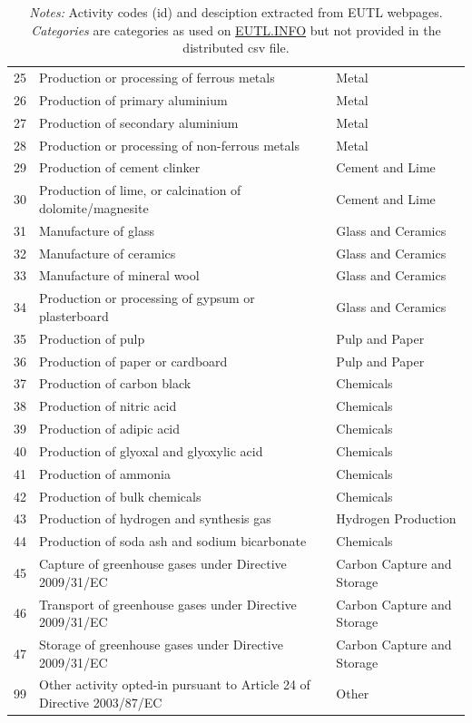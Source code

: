 \documentclass[authoryear]{elsarticle}
\begin{document}
\begin{table}[htbp]
\begin{tabular*}{\textwidth}{@{}@{\extracolsep{\fill}} lp{30.18em}l @{}}
		25    & Production or processing of ferrous metals & Metal \\
		26    & Production of primary aluminium & Metal \\
		27    & Production of secondary aluminium & Metal \\
		28    & Production or processing of non-ferrous metals & Metal \\
		29    & Production of cement clinker & Cement and Lime \\
		30    & Production of lime, or calcination of dolomite/magnesite & Cement and Lime \\
		31    & Manufacture of glass & Glass and Ceramics \\
		32    & Manufacture of ceramics & Glass and Ceramics \\
		33    & Manufacture of mineral wool & Glass and Ceramics \\
		34    & Production or processing of gypsum or plasterboard & Glass and Ceramics \\
		35    & Production of pulp & Pulp and Paper \\
		36    & Production of paper or cardboard & Pulp and Paper \\
		37    & Production of carbon black & Chemicals \\
		38    & Production of nitric acid & Chemicals \\
		39    & Production of adipic acid & Chemicals \\
		40    & Production of glyoxal and glyoxylic acid & Chemicals \\
		41    & Production of ammonia & Chemicals \\
		42    & Production of bulk chemicals & Chemicals \\
		43    & Production of hydrogen and synthesis gas & Hydrogen Production \\
		44    & Production of soda ash and sodium bicarbonate & Chemicals \\
		45    & Capture of greenhouse gases under Directive 2009/31/EC & Carbon Capture and Storage \\
		46    & Transport of greenhouse gases under Directive 2009/31/EC & Carbon Capture and Storage \\
		47    & Storage of greenhouse gases under Directive 2009/31/EC & Carbon Capture and Storage \\
		99	  & Other activity opted-in pursuant to Article 24 of Directive 2003/87/EC&	Other\\
		\bottomrule
		\bottomrule
	\end{tabular*}%
	\vspace{0ex}
	\caption*{\footnotesize \emph{Notes:} Activity codes (id) and desciption extracted from EUTL webpages. \emph{Categories} are categories as used on \href{https://euets.info}{EUTL.INFO} but not provided in the distributed csv file.}
	\vspace{0ex}
\end{table}%
\end{document}

